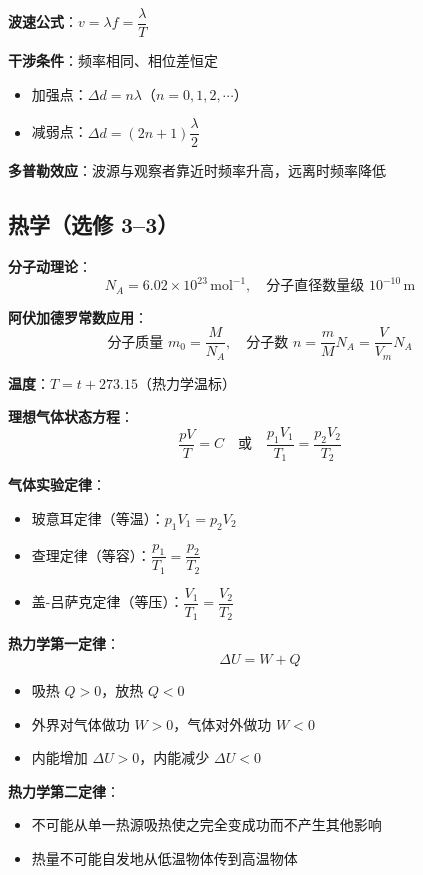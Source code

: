 \textbf{波速公式}：$v = \lambda f = \dfrac{\lambda}{T}$

\textbf{干涉条件}：频率相同、相位差恒定
\begin{itemize}
  \item 加强点：$\Delta d = n\lambda$（$n=0,1,2,\cdots$）
  \item 减弱点：$\Delta d = (2n+1)\dfrac{\lambda}{2}$
\end{itemize}

\textbf{多普勒效应}：波源与观察者靠近时频率升高，远离时频率降低

\subsection{热学（选修 3--3）}

\textbf{分子动理论}：
\[
N_A = 6.02\times10^{23}\,\text{mol}^{-1},\quad
\text{分子直径数量级 }10^{-10}\,\text{m}
\]

\textbf{阿伏加德罗常数应用}：
\[
\text{分子质量 } m_0 = \frac{M}{N_A},\quad
\text{分子数 } n = \frac{m}{M}N_A = \frac{V}{V_m}N_A
\]

\textbf{温度}：$T = t + 273.15$（热力学温标）

\textbf{理想气体状态方程}：
\[
\frac{pV}{T} = C\quad\text{或}\quad
\frac{p_1V_1}{T_1} = \frac{p_2V_2}{T_2}
\]

\textbf{气体实验定律}：
\begin{itemize}
  \item 玻意耳定律（等温）：$p_1V_1 = p_2V_2$
  \item 查理定律（等容）：$\dfrac{p_1}{T_1} = \dfrac{p_2}{T_2}$
  \item 盖-吕萨克定律（等压）：$\dfrac{V_1}{T_1} = \dfrac{V_2}{T_2}$
\end{itemize}

\textbf{热力学第一定律}：
\[
\Delta U = W + Q
\]
\begin{itemize}
  \item 吸热 $Q>0$，放热 $Q<0$
  \item 外界对气体做功 $W>0$，气体对外做功 $W<0$
  \item 内能增加 $\Delta U>0$，内能减少 $\Delta U<0$
\end{itemize}

\textbf{热力学第二定律}：
\begin{itemize}
  \item 不可能从单一热源吸热使之完全变成功而不产生其他影响
  \item 热量不可能自发地从低温物体传到高温物体
\end{itemize}

